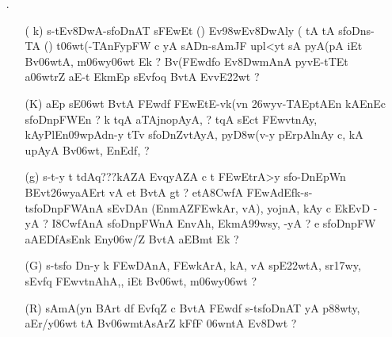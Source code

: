 \def\DevnagVersion{2.15}\documentclass{article}
\begin{document}
\begin{itemize}

\item[{\dn \dnnum \rn{23}}.] \begin{itemize}
           
           \item[( {\dn k})] {\dn s\2-tEv\38DwA{\rs -\re}s\2foDnAT{\rdt} s\2\3FEwEt {\rs (\re}{\dn \dnnum {}}{\rs )\re} Ev\398wEv\38DwAly\? {\rs (\re}{\dn\dnnum {}} tA tA s\2foDns\2-TA {\rs (\re}{\dn\dnnum {}}{\rs )\re} t\306wt(-TAnFypFW\? c yA sADn{\rs -\re}sAmJF upl<yt\?{\rs ,\re} sA pyA\0(pA iEt Bv\306wtA, m\306wy\306wt\? Ek {\rs ?\re} Bv(\3FEwd\?fo Ev\38DwmAnA\2 py\0vE-tTEt a\306wtr\?Z aE-t EkmEp sEvfoq\2 BvtA\2 EvvE\322wt {\rs ?\re}} 

           \item[({\dn K})] {\dn aEp sE\306wt BvtA\2 \3FEwd\?f\? \3FEwEtE-vk(v\?n \326wyv-TAEptAEn kAEnEc s\2foDnpFWEn {\rs ?\re} k\? t\?qA aTA\0j\0nopAyA, {\rs ?\re} t\?qA\2 sEct\2 \3FEwvt\0{\rs -\re}nAy{\rs ,\re} kAy\0PlEn\309wpAdn-y tT\4v s\2foDnZvtAyA, py\0\3D8w(v-y pErpAlnAy c{\rs ,\re} kA upAyA Bv\306wt, EnEd\2f\?, {\rs ?\re}}
           
           \item[({\dn g})] {\dn s\2-t-y t\? tdAq{\rs ???\re}kAZA\2 EvqyAZA\2 c t\? \3FEwEtrA>y\2 s\2fo{\rs -\re}DnEpW\?n BEvt\326wyaAErt vA et BvtA\2 gt {\rs ?\re} etA\38CwfA\2  \3FEwAd\?Efk{\rs -\re}s\2-ts\2foDnpFWAnA\2 s\2EvDAn\2 {\rs (\re}EnmA\0Z\3FEwkAr, vA{\rs ),\re} yojnA{\rs ,\re} kAy\0 c Ek\2EvD\2 -yA {\rs ?\re} I\38CwfAnA\2 s\2foDnpFWnA\2 EnvA\0h, EkmA\399wsy, -yA {\rs ?\re} e s\2foDnpFW\? aAEDfAsEnk\2 Eny\306w/Z\2 BvtA aEBmt\2 Ek {\rs ?\re}}

          \item[({\dn G})] {\dn s\2-ts\2fo Dn-y k\? \3FEwDAnA, \3FEwkArA, kA, vA sp\?E\322wtA, sr\317wy, sEvf\?{\qva}q \3FEwvt\0nAhA\0,{\rs ,\re} iEt Bv\306wt, m\306wy\306wt\? {\rs ?\re}}
          
          \item[({\dn R})] {\dn sAmA(y\?n BArt\? d\?f\?{\rs ,\re} Evf\?q\?Z c BvtA\2 \3FEwd\?f\?{\rs ,\re} s\2-ts\2foDnAT{\rdt} yA\2 p\388wty, aEr/y\306wt\?{\rs ,\re} tA   Bv\306wmtAsAr\?Z kFfF \306wntA Ev\38Dwt\? {\rs ?\re}}
          

\end{itemize}
\end{itemize}
\end{document}
